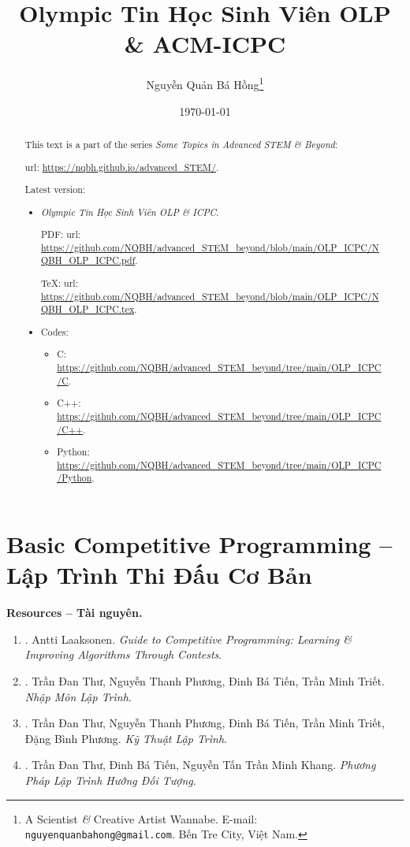 \documentclass{article}
\title{Olympic Tin Học Sinh Viên OLP \& ACM-ICPC}
\author{Nguyễn Quản Bá Hồng\footnote{A Scientist {\it\&} Creative Artist Wannabe. E-mail: {\tt nguyenquanbahong@gmail.com}. Bến Tre City, Việt Nam.}}
\date{\today}
\begin{document}
\maketitle
\begin{abstract}
	This text is a part of the series {\it Some Topics in Advanced STEM \& Beyond}:
	
	{\sc url}: \url{https://nqbh.github.io/advanced_STEM/}.
	
	Latest version:
	\begin{itemize}
		\item {\it Olympic Tin Học Sinh Viên OLP \& ICPC}.
		
		PDF: {\sc url}: \url{https://github.com/NQBH/advanced_STEM_beyond/blob/main/OLP_ICPC/NQBH_OLP_ICPC.pdf}.
		
		\TeX: {\sc url}: \url{https://github.com/NQBH/advanced_STEM_beyond/blob/main/OLP_ICPC/NQBH_OLP_ICPC.tex}.
		\item Codes:
		\begin{itemize}
			\item C: \url{https://github.com/NQBH/advanced_STEM_beyond/tree/main/OLP_ICPC/C}.
			\item C++: \url{https://github.com/NQBH/advanced_STEM_beyond/tree/main/OLP_ICPC/C++}.
			\item Python: \url{https://github.com/NQBH/advanced_STEM_beyond/tree/main/OLP_ICPC/Python}.
		\end{itemize}
	\end{itemize}
\end{abstract}
\tableofcontents


\section{Basic Competitive Programming -- Lập Trình Thi Đấu Cơ Bản}
\textbf{\textsf{Resources -- Tài nguyên.}}
\begin{enumerate}
	\item \cite{Laaksonen2020}. {\sc Antti Laaksonen}. {\it Guide to Competitive Programming: Learning \& Improving Algorithms Through Contests}.
	\item \cite{Thu_Phuong_Tien_Triet_NMLT}. {\sc Trần Đan Thư, Nguyễn Thanh Phương, Đinh Bá Tiến, Trần Minh Triết}. {\it Nhập Môn Lập Trình}.
	\item \cite{Thu_Phuong_Tien_Triet_Phuong_KTLT}. {\sc Trần Đan Thư, Nguyễn Thanh Phương, Đinh Bá Tiến, Trần Minh Triết, Đặng Bình Phương}. {\it Kỹ Thuật Lập Trình}.
	\item \cite{Thu_Tien_Khang_PPLTHDT}. {\sc Trần Đan Thư, Đinh Bá Tiến, Nguyễn Tấn Trần Minh Khang}. {\it Phương Pháp Lập Trình Hướng Đối Tượng}.
\end{enumerate}
\end{document}

